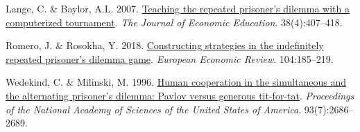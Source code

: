 \documentclass[11pt,preprint]{elsarticle}
\numberwithin{equation}{section}
\numberwithin{figure}{section}
\numberwithin{table}{section}
\newlength{\cslhangindent}
\newenvironment{CSLReferences}[2] %
{\begin{list}{}{%
	\setlength{\itemindent}{0pt}
	\setlength{\leftmargin}{0pt}
	\setlength{\parsep}{0pt}
	\ifodd #1
	\setlength{\leftmargin}{\cslhangindent}
	\setlength{\itemindent}{-1\cslhangindent}
	\fi
	\setlength{\itemsep}{#2\baselineskip}}}
{\end{list}}
\begin{document}
\begin{CSLReferences}{1}{1}
Lange, C. \& Baylor, A.L. 2007.
\href{https://doi.org/10.3200/JECE.38.4.407-418}{Teaching the repeated
prisoner's dilemma with a computerized tournament}. \emph{The Journal of
Economic Education}. 38(4):407--418.

Romero, J. \& Rosokha, Y. 2018.
\href{https://doi.org/10.1016/j.euroecorev.2018.02.008}{Constructing
strategies in the indefinitely repeated prisoner's dilemma game}.
\emph{European Economic Review}. 104:185--219.

Wedekind, C. \& Milinski, M. 1996.
\href{https://doi.org/10.1073/pnas.93.7.2686}{Human cooperation in the
simultaneous and the alternating prisoner's dilemma: Pavlov versus
generous tit-for-tat}. \emph{Proceedings of the National Academy of
Sciences of the United States of America}. 93(7):2686--2689.

\end{CSLReferences}


\end{document}
